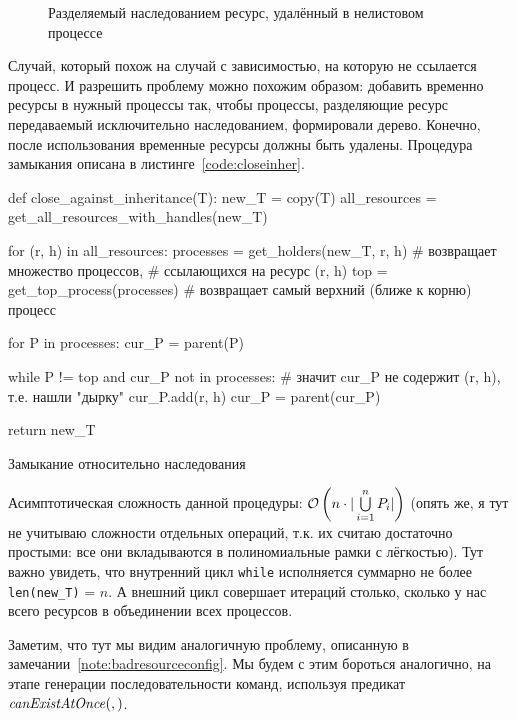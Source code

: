 \begin{figure}[ht!]
\centering
{}
\caption{Разделяемый наследованием ресурс, удалённый в нелистовом процессе}
\label{fig:inherithole}
\end{figure}

Случай, который похож на случай с зависимостью, на которую не ссылается процесс. И разрешить проблему можно похожим образом: добавить временно ресурсы в нужный процессы так, чтобы процессы, разделяющие ресурс передаваемый исключительно наследованием, формировали дерево. Конечно, после использования временные ресурсы должны быть удалены.
Процедура замыкания описана в листинге~\ref{code:closeinher}.

\begin{listing}[ht!]
\begin{pythoncode}
def close_against_inheritance(T):
    new_T = copy(T)
    all_resources = get_all_resources_with_handles(new_T)

    for (r, h) in all_resources:
        processes = get_holders(new_T, r, h)  # возвращает множество процессов, 
                                              # ссылающихся на ресурс (r, h)
        top = get_top_process(processes)  # возвращает самый верхний (ближе к корню) процесс

        for P in processes:
            cur_P = parent(P)

            while P != top and cur_P not in processes:
                # значит cur_P не содержит (r, h), т.е. нашли "дырку"
                cur_P.add(r, h)
                cur_P = parent(cur_P)

    return new_T
\end{pythoncode}

\caption{Замыкание относительно наследования}
\label{code:closeinher}
\end{listing}

Асимптотическая сложность данной процедуры:  $\mathcal{O}\left(n\cdot|\bigcup\limits_{i = 1}^{n}{P_i}|\right)$ (опять же, я тут не учитываю сложности отдельных операций, т.к. их считаю достаточно простыми: все они вкладываются в полиномиальные рамки с лёгкостью). Тут важно увидеть, что внутренний цикл \texttt{while} исполняется суммарно не более \texttt{len(new\_T)} = $n$. А внешний цикл совершает итераций столько, сколько у нас всего ресурсов в объединении всех процессов.

Заметим, что тут мы видим аналогичную проблему, описанную в замечании~\ref{note:badresourceconfig}. Мы будем с этим бороться аналогично, на этапе генерации последовательности команд, используя предикат $\text{\textit{canExistAtOnce}}(, )$.


